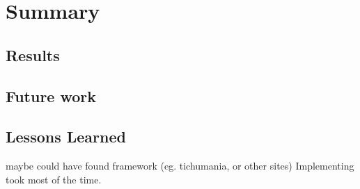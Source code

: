 \chapter{Summary}


\section{Results}
\section{Future work}

\section{Lessons Learned}
maybe could have found framework (eg. tichumania, or other sites) Implementing took most of the time.
